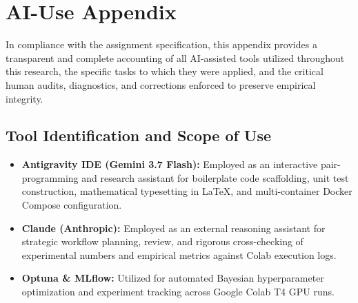 \documentclass[conference]{IEEEtran}
\begin{document}



\appendices
\section{AI-Use Appendix}
In compliance with the assignment specification, this appendix provides a transparent and complete accounting of all AI-assisted tools utilized throughout this research, the specific tasks to which they were applied, and the critical human audits, diagnostics, and corrections enforced to preserve empirical integrity.

\subsection{Tool Identification and Scope of Use}
\begin{itemize}
    \item \textbf{Antigravity IDE (Gemini 3.7 Flash):} Employed as an interactive pair-programming and research assistant for boilerplate code scaffolding, unit test construction, mathematical typesetting in LaTeX, and multi-container Docker Compose configuration.
    \item \textbf{Claude (Anthropic):} Employed as an external reasoning assistant for strategic workflow planning, review, and rigorous cross-checking of experimental numbers and empirical metrics against Colab execution logs.
    \item \textbf{Optuna \& MLflow:} Utilized for automated Bayesian hyperparameter optimization and experiment tracking across Google Colab T4 GPU runs.
\end{itemize}
\end{document}
